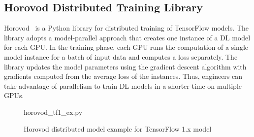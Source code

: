 \subsection{Horovod Distributed Training Library}

Horovod~\cite{sergeev2018horovod} is a Python library for distributed training 
of TensorFlow models. 
The library adopts a model-parallel approach that creates one instance of a DL
model for each GPU.
In the training phase, each GPU runs the computation of a single model instance
for a batch of input data and computes a loss separately.
The library updates the model parameters using the gradient descent algorithm
with gradients computed from the average loss of the instances.
Thus, engineers can take advantage of parallelism to train DL models in a
shorter time on multiple GPUs.

\begin{figure}[ht!]
 
{horovod_tf1_ex.py}
  \caption{Horovod distributed model example for TensorFlow 1.x model}
\label{fig:back:hvd1} 
\end{figure}

